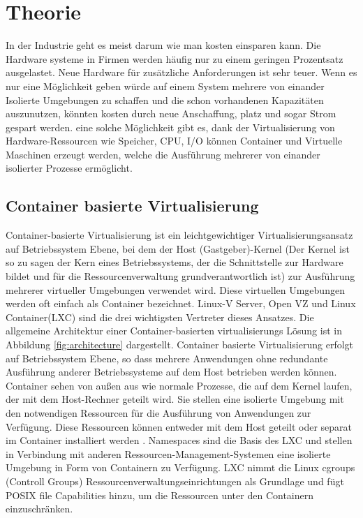 \thispagestyle{empty}

\section{Theorie}

In der Industrie geht es meist darum wie man kosten einsparen kann. Die Hardware systeme in Firmen werden häufig nur zu einem geringen Prozentsatz ausgelastet. Neue Hardware für zusätzliche Anforderungen ist sehr teuer. Wenn es nur eine Möglichkeit geben würde auf einem System mehrere von einander Isolierte Umgebungen zu schaffen und die schon vorhandenen Kapazitäten auszunutzen, könnten kosten durch neue Anschaffung, platz und sogar Strom gespart werden. eine solche Möglichkeit gibt es, dank der Virtualisierung von Hardware-Ressourcen wie Speicher, CPU, I/O können Container und Virtuelle Maschinen erzeugt werden, welche die Ausführung mehrerer von einander isolierter Prozesse ermöglicht.

\pagebreak

\subsection{Container basierte Virtualisierung}
Container-basierte Virtualisierung ist ein leichtgewichtiger Virtualisierungsansatz auf Betriebssystem Ebene, bei dem der Host (Gastgeber)-Kernel (Der Kernel ist so zu sagen der Kern eines Betriebssystems, der die Schnittstelle zur Hardware bildet und für die Ressourcenverwaltung grundverantwortlich ist) zur Ausführung mehrerer virtueller Umgebungen verwendet wird. Diese virtuellen Umgebungen werden oft einfach als \glqq Container \grqq{} bezeichnet. Linux-V Server\cite{Overview2018PaperLinux-VServer}, Open VZ\cite{IndexOpenvz.org} und Linux Container(LXC)\cite{IndexLinuxcontainers.Org} sind die drei wichtigsten Vertreter dieses Ansatzes. Die allgemeine Architektur einer Container-basierten virtualisierungs Lösung ist in Abbildung \ref{fig:architecture} dargestellt. Container basierte Virtualisierung erfolgt auf Betriebssystem Ebene, so dass mehrere Anwendungen ohne redundante Ausführung anderer Betriebssysteme auf dem Host betrieben werden können. Container sehen von außen aus wie normale Prozesse, die auf dem Kernel laufen, der mit dem Host-Rechner geteilt wird. Sie stellen eine isolierte Umgebung mit den notwendigen Ressourcen für die Ausführung von Anwendungen zur Verfügung. Diese Ressourcen können entweder mit dem Host geteilt oder separat im Container installiert werden \cite{Xavier2014AClusters}. Namespaces sind die Basis des LXC und stellen in Verbindung mit anderen Ressourcen-Management-Systemen eine isolierte Umgebung in Form von Containern zu Verfügung. LXC nimmt die Linux cgroups (Controll Groups) Ressourcenverwaltungseinrichtungen\cite{Heo2015ControlV2} als Grundlage und fügt POSIX file Capabilities\cite{Overview2018PaperLinux-VServer} hinzu, um die Ressourcen unter den Containern einzuschränken. 


